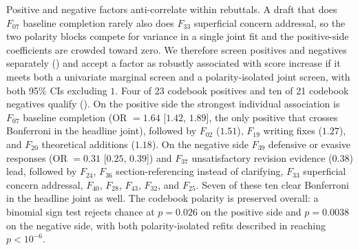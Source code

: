 \documentclass{article}
\begin{document}
Positive and negative factors anti-correlate within rebuttals. A draft that does $F_{07}$ baseline completion rarely also does $F_{33}$ superficial concern addressal, so the two polarity blocks compete for variance in a single joint fit and the positive-side coefficients are crowded toward zero. We therefore screen positives and negatives separately () and accept a factor as robustly associated with score increase if it meets both a univariate marginal screen and a polarity-isolated joint screen, with both 95\% CIs excluding $1$. Four of 23 codebook positives and ten of 21 codebook negatives qualify (). On the positive side the strongest individual association is $F_{07}$ baseline completion (OR $= 1.64$ [$1.42$, $1.89$], the only positive that crosses Bonferroni in the headline joint), followed by $F_{02}$ ($1.51$), $F_{19}$ writing fixes ($1.27$), and $F_{20}$ theoretical additions ($1.18$). On the negative side $F_{39}$ defensive or evasive responses (OR $= 0.31$ [$0.25$, $0.39$]) and $F_{37}$ unsatisfactory revision evidence ($0.38$) lead, followed by $F_{24}$, $F_{36}$ section-referencing instead of clarifying, $F_{33}$ superficial concern addressal, $F_{40}$, $F_{28}$, $F_{43}$, $F_{32}$, and $F_{25}$. Seven of these ten clear Bonferroni in the headline joint as well. The codebook polarity is preserved overall: a binomial sign test rejects chance at $p = 0.026$ on the positive side and $p = 0.0038$ on the negative side, with both polarity-isolated refits described in  reaching $p < 10^{-6}$.
\end{document}
